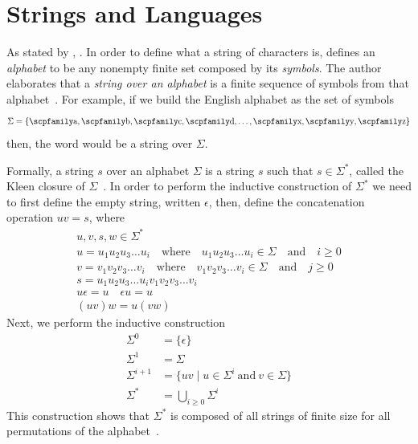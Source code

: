 \documentclass[
  oneside,
  english,
  coorientadorbanca,
  noabntexcite
]{ufsc-thesis-rn46-2019}
\newcommand{\code}[1]{\text{\scpfamily\setlength\spaceskip{0.35em}#1}}
\begin{document}
\section{Strings and Languages}\label{ch:background:sec:strings_and_languages}

As stated by \textcite{sipser2012introduction}, .
In order to define what a string of characters is, \textcite{sipser2012introduction} defines an \textit{alphabet} to be any nonempty finite set composed by its \textit{symbols}.
The author elaborates that a \textit{string over an alphabet} is a finite sequence of symbols from that alphabet~\cite{sipser2012introduction}.
For example, if we build the English alphabet as the set of symbols
\begin{equation*}
  \Sigma = \{\code{a}, \code{b}, \code{c}, \code{d}, \dots, \code{x}, \code{y}, \code{z}\}
\end{equation*}
then, the word \code{compiler} would be a string over $\Sigma$.

Formally, a string $s$ over an alphabet $\Sigma$ is a string $s$ such that $s \in \Sigma^*$, called the Kleen closure of $\Sigma$~\cite{HopcroftMotwaniUllman07}.
In order to perform the inductive construction of $\Sigma^*$ we need to first define the empty string, written $\epsilon$, then, define the concatenation operation $uv = s$, where
\begin{gather*}
  u, v, s, w \in \Sigma^* \\
  u = u_1 u_2 u_3 \dots u_i \quad \text{where} \quad u_1 u_2 u_3 \dots u_i \in \Sigma \quad \text{and} \quad i \geq 0\\
  v = v_1 v_2 v_3 \dots v_i \quad \text{where} \quad v_1 v_2 v_3 \dots v_i \in \Sigma \quad \text{and} \quad j \geq 0\\
  s = u_1 u_2 u_3 \dots u_i v_1 v_2 v_3 \dots v_i \\
  u\epsilon = u \quad \epsilon u = u\\
  (uv)w = u(vw)
\end{gather*}
Next, we perform the inductive construction
\begin{align*}
  \Sigma^0     & = \{ \epsilon \}                                           \\
  \Sigma^1     & = \Sigma                                                   \\
  \Sigma^{i+1} & = \{ uv \mid u \in \Sigma^{i}\ \text{and}\ v \in \Sigma \} \\
  \Sigma^*     & = \bigcup_{i \geq 0} \Sigma^i
\end{align*}
This construction shows that $\Sigma^*$ is composed of all strings of finite size for all permutations of the alphabet~\cite{HopcroftMotwaniUllman07}.
\end{document}
